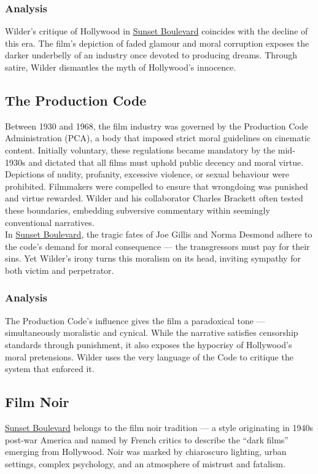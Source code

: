 \documentclass[a4paper]{article}
\begin{document}
\subsubsection{Analysis}
Wilder’s critique of Hollywood in \underline{Sunset Boulevard} coincides with the decline of this era. The film’s depiction of faded glamour and moral corruption exposes the darker underbelly of an industry once devoted to producing dreams. Through satire, Wilder dismantles the myth of Hollywood’s innocence.\\

\subsection{The Production Code}
Between 1930 and 1968, the film industry was governed by the Production Code Administration (PCA), a body that imposed strict moral guidelines on cinematic content. Initially voluntary, these regulations became mandatory by the mid-1930s and dictated that all films must uphold public decency and moral virtue.\\

Depictions of nudity, profanity, excessive violence, or sexual behaviour were prohibited. Filmmakers were compelled to ensure that wrongdoing was punished and virtue rewarded. Wilder and his collaborator Charles Brackett often tested these boundaries, embedding subversive commentary within seemingly conventional narratives.\\

In \underline{Sunset Boulevard}, the tragic fates of Joe Gillis and Norma Desmond adhere to the code’s demand for moral consequence — the transgressors must pay for their sins. Yet Wilder’s irony turns this moralism on its head, inviting sympathy for both victim and perpetrator.\\

\subsubsection{Analysis}
The Production Code’s influence gives the film a paradoxical tone — simultaneously moralistic and cynical. While the narrative satisfies censorship standards through punishment, it also exposes the hypocrisy of Hollywood’s moral pretensions. Wilder uses the very language of the Code to critique the system that enforced it.\\

\subsection{Film Noir}
\underline{Sunset Boulevard} belongs to the film noir tradition — a style originating in 1940s post-war America and named by French critics to describe the “dark films” emerging from Hollywood. Noir was marked by chiaroscuro lighting, urban settings, complex psychology, and an atmosphere of mistrust and fatalism.\\
\end{document}
